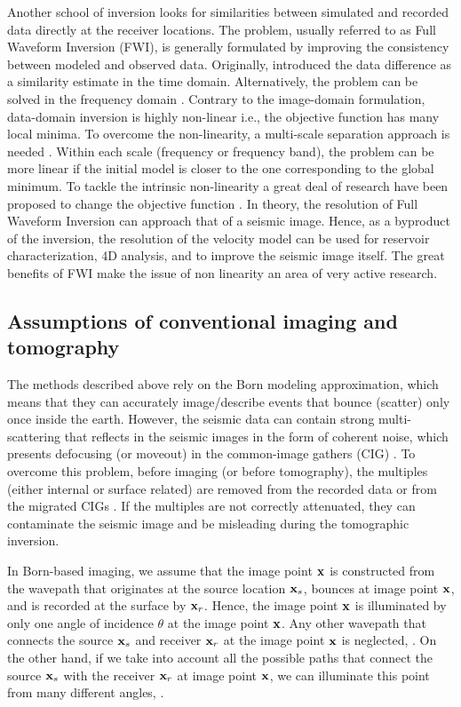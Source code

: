 Another school of inversion looks for similarities between simulated and recorded data
directly at the receiver locations. The problem, usually referred to as Full Waveform Inversion (FWI),
is generally formulated by  improving the consistency between modeled and observed data. 
 Originally, \cite{tarantola} introduced the data difference as 
a similarity estimate in the time domain. Alternatively, the problem 
can be solved in the frequency domain \citep{Pratt99}. Contrary to 
 the image-domain formulation, data-domain inversion is highly non-linear 
i.e., the objective function has many local minima. To overcome the non-linearity,
 a multi-scale separation approach is needed \citep{Bunks95}. Within each scale (frequency
or frequency band), the problem can be more linear if the initial model
is closer to the one corresponding to the global minimum. To tackle the intrinsic
non-linearity a great deal of research have been proposed to change the objective 
function \citep{ShinHa.geo.2008,shin_cha,Sirgue,Luo91,warner,TariqChoi,engquist2013application}. In theory, the resolution
of Full Waveform Inversion can approach that of a seismic image. Hence, as a byproduct of the 
inversion, the resolution of the velocity model can be used for reservoir characterization, 4D analysis,
and to improve the seismic image itself. The great benefits
of FWI make the issue of non linearity an area of very active research. 


\subsection{Assumptions of conventional imaging and tomography}
The methods described above rely on the Born modeling approximation, which means that 
they can accurately image/describe events that bounce (scatter) only once inside the earth. However,
 the seismic data can contain strong multi-scattering  that reflects in the seismic images 
in the form of coherent noise, which presents defocusing (or moveout) in the common-image gathers (CIG) . 
 To overcome this problem, before imaging (or before tomography), the multiples (either internal
or surface related) are removed from the recorded data \citep{SRME,ArtWeiglein,guitton2005,Herrmann} or from the 
migrated CIGs \citep{SavaGuitton,Wang,Weibull}. If the multiples are not correctly attenuated, 
they can contaminate the seismic image and be misleading during the tomographic inversion. 

In Born-based imaging, we assume that the image point ${\bf x}$ is constructed from the 
wavepath that originates at the source location ${\bf x}_s$, bounces at image point ${\bf x}$, and is recorded
at the surface by ${\bf x}_r$. Hence, the image point ${\bf x}$ is illuminated by only 
one angle of incidence $\theta$ at the image point ${\bf x}$. 
 Any other wavepath that connects the source ${\bf x}_s$ and receiver ${\bf x}_r$ at
the image point ${\bf x}$ is neglected, . On the other hand, if we take into account
all the possible paths that connect the source ${\bf x}_s$ with the receiver ${\bf x}_r$ at image point ${\bf x}$,
 we can illuminate this point from many different angles, . 


